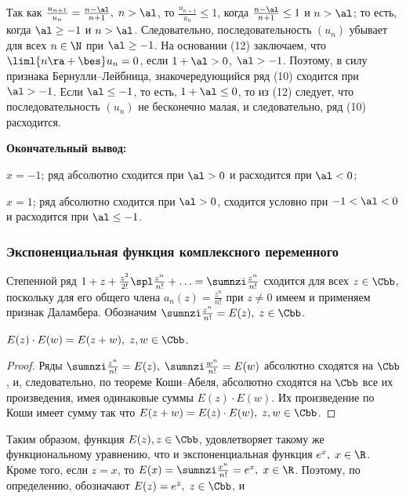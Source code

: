 \documentclass[a4paper]{article}
\begin{document}
Так как $\frac{u_{n+1}}{u_n} = \frac{n-\al}{n+1}, \; n>\al$, то
$\frac{u_{n+1}}{u_n}\le1$, когда $\frac{n-\al}{n+1}\le1$ и $n>\al$;
то есть, когда $\al\ge-1$ и $n>\al$. Следовательно,
последовательность $(u_n)$ убывает для всех $n\in\N$ при $\al\ge-1$.
На основании (12) заключаем, что $\liml{n\ra+\bes}u_n=0$, если
$1+\al>0$, $\al>-1$. Поэтому, в силу признака Бернулли--Лейбница,
знакочередующийся ряд (10) сходится при $\al>-1$. Если $\al\le-1$,
то есть, $1+\al\le0$, то из (12) следует, что последовательность
$(u_n)$ не бесконечно малая, и следовательно, ряд (10) расходится.

\textbf{Окончательный вывод:}

$x=-1$; ряд абсолютно сходится при $\al>0$ и расходится при $\al<0$;

$x=1$; ряд абсолютно сходится при $\al>0$, сходится условно при
$-1<\al<0$ и расходится при $\al\le-1$.

\subsubsection{Экспоненциальная функция комплексного переменного}

Степенной ряд $1+z + \frac{z^2}{2!} \spl \frac{z^n}{n!} + \ldots =
\sumnzi \frac{z^n}{n!}$ сходится для всех $z\in\Cbb$, поскольку для
его общего члена $a_n(z) = \frac{z^n}{n!}$ при $z\ne0$ имеем
 и применяем признак
Даламбера. Обозначим $\sumnzi \frac{z^n}{n!} = E(z), \; z\in\Cbb$.

\begin{theorem}
$E(z)\cdot E(w) = E(z+w), \; z,w\in\Cbb$.
\end{theorem}

\begin{proof}
Ряды $\sumnzi \frac{z^n}{n!} = E(z), \; \sumnzi \frac{w^n}{n!} =
E(w)$ абсолютно сходятся на $\Cbb$, и, следовательно, по теореме
Коши--Абеля, абсолютно сходятся на $\Cbb$ все их произведения, имея
одинаковые суммы $E(z)\cdot E(w)$. Их произведение по Коши имеет
сумму  так что
$E(z+w)=E(z)\cdot E(w), \; z,w\in\Cbb$.
\end{proof}

Таким образом, функция $E(z), z\in\Cbb$, удовлетворяет такому же
функциональному уравнению, что и экспоненциальная функция $e^x, \;
x\in\R$. Кроме того, если $z=x$, то $E(x) = \sumnzi \frac{x^n}{n!} =
e^x, \; x\in\R$. Поэтому, по определению, обозначают $E(z) = e^z, \;
z\in\Cbb$, и 
\end{document}
